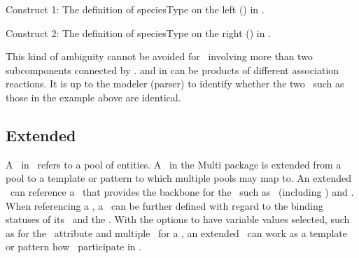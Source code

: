 Construct 1: The definition of speciesType  on the left () in .

Construct 2: The definition of speciesType  on the right () in .

This kind of ambiguity cannot be avoided for \speciesTypes\ involving more than two subcomponents connected by \inSpeciesTypeBonds.  and  in  can be products of different association reactions. It is up to the modeler (parser) to identify whether the two \speciesTypes\ such as those in the example above are identical.

\clearpage

\mBlockChangedBegin{\revTwentyTwentyMarch}
\subsection{Extended }\mBlockChangedEnd{\revTwentyTwentyMarch}
\label{def:ExSpecies}

A \species\ in \SbmlLevelThreeCore\ refers to a pool of entities. A \species\ in the Multi package is extended from a pool to a template or pattern to which multiple pools may map \mBlockChangedBegin{\revTwentyTwentyMarch}to\mBlockChangedEnd{\revTwentyTwentyMarch}. An extended \species\ can reference a \speciesType\ that provides the backbone for the \species\ such as \components\ (including \bindingSites) and \speciesFeatureTypes. When referencing a \speciesType, a \species\ can be further defined with regard to the binding statuses of its \outwardBindingSites\ and the \speciesFeatures. With the options to have variable values selected, such as  for the \bindingStatusAtt\ attribute and multiple \possibleSpeciesFeatureValues\ for a \speciesFeature, an extended \species\ can work as a template or pattern how \species\ participate in \reactions.  


